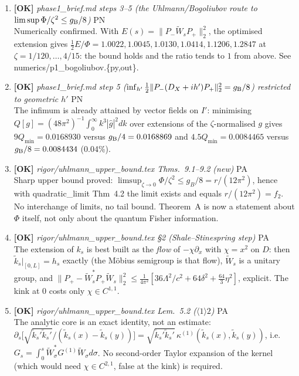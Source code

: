 \documentclass[11pt]{article}
\begin{document}
\begin{enumerate}[leftmargin=1.6em,itemsep=6pt]
\item \textbf{[OK]} \emph{phase1\_brief.md steps 3--5 (the Uhlmann/Bogoliubov route to \(\limsup\Phi/\zeta^2\le g_{\rm B}/8\))} \hfill\textsc{PN}\\ Numerically confirmed. With \(E(s)=\|P_-\widetilde W_sP_+\|_2^2\), the optimised extension gives \(\tfrac12E/\Phi=1.0022,1.0045,1.0130,1.0414,1.1206,1.2847\) at \(\zeta=1/120,\dots,4/15\): the bound holds and the ratio tends to \(1\) from above. See numerics/p1\_bogoliubov.\{py,out\}.
\item \textbf{[OK]} \emph{phase1\_brief.md step 5 (\(\inf_{h'}\tfrac12\|P_-(D_X+ih')P_+\|_2^2=g_{\rm B}/8\)) restricted to geometric \(h'\)} \hfill\textsc{PN}\\ The infimum is already attained by vector fields on \(I'\): minimising \(Q[g]=(48\pi^2)^{-1}\int_0^\infty k^3|\hat g|^2dk\) over extensions of the \(\zeta\)-normalised \(g\) gives \(9Q_{\min}=0.0168930\) versus \(g_{\rm B}/4=0.0168869\) and \(4.5Q_{\min}=0.0084465\) versus \(g_{\rm B}/8=0.0084434\) (0.04\%).
\item \textbf{[OK]} \emph{rigor/uhlmann\_upper\_bound.tex Thms.~9.1--9.2 (new)} \hfill\textsc{PA}\\ Sharp upper bound proved: \(\limsup_{\zeta\to0}\Phi/\zeta^2\le g_B/8=r/(12\pi^2)\), hence with quadratic\_limit Thm~4.2 the limit exists and equals \(r/(12\pi^2)=f_2\). No interchange of limits, no tail bound. Theorem~A is now a statement about \(\Phi\) itself, not only about the quantum Fisher information.
\item \textbf{[OK]} \emph{rigor/uhlmann\_upper\_bound.tex \S2 (Shale--Stinespring step)} \hfill\textsc{PA}\\ The extension of \(k_s\) is best built as the \emph{flow} of \(-\chi\partial_x\) with \(\chi=x^2\) on \(D\): then \(\widetilde k_s|_{[0,L]}=h_s\) exactly (the M\"obius semigroup is that flow), \(\widetilde W_s\) is a unitary group, and \(\lVert P_+-\widetilde W_s^*P_+\widetilde W_s\rVert_2^2\le\frac1{4\pi^2}[36\Lambda^2/c^2+64\delta^2+\frac{64}3\eta^2]\), explicit. The kink at \(0\) costs only \(\chi\in C^{1,1}\).
\item \textbf{[OK]} \emph{rigor/uhlmann\_upper\_bound.tex Lem.~5.2 (\(\langle1\rangle2\))} \hfill\textsc{PA}\\ The analytic core is an exact identity, not an estimate: \(\partial_s\big[\sqrt{\widetilde k_s'\widetilde k_s'}/(\widetilde k_s(x)-\widetilde k_s(y))\big]=\sqrt{\widetilde k_s'\widetilde k_s'}\,\kappa^{(1)}(\widetilde k_s(x),\widetilde k_s(y))\), i.e.\ \(G_s=\int_0^s\widetilde W_\sigma^*G^{(1)}\widetilde W_\sigma d\sigma\). No second-order Taylor expansion of the kernel (which would need \(\chi\in C^{2,1}\), false at the kink) is required.

\end{enumerate}
\end{document}
